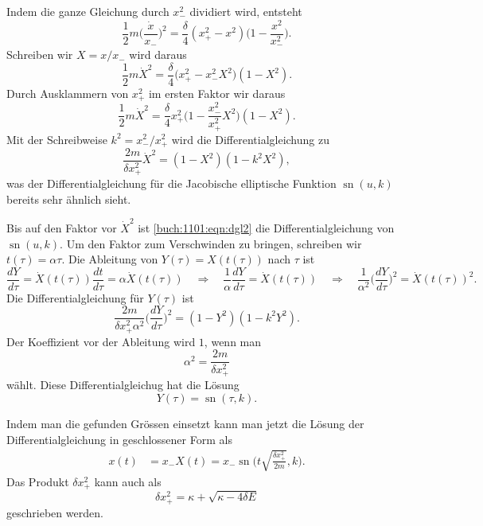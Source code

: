 \begin{loesung}
\begin{teilaufgaben}
\item
Indem die ganze Gleichung durch $x_-^2$ dividiert wird, entsteht 
\[
\frac12m
\biggl(\frac{\dot{x}}{x_-}\biggr)^2
=
\frac{\delta}{4}
(x_+^2-x^2)
\biggl(1-\frac{x^2}{x_-^2}\biggr).
\]
Schreiben wir $X=x/x_-$ wird daraus
\[
\frac1{2}m\dot{X}^2
=
\frac{\delta}{4}
\biggl(x_+^2-x_-^2 X^2\biggr)
(1-X^2).
\]
Durch Ausklammern von $x_+^2$ im ersten Faktor  wir daraus
\[
\frac1{2}m\dot{X}^2
=
\frac{\delta}{4}
x_+^2
\biggl(1-\frac{x_-^2}{x_+^2} X^2\biggr)
(1-X^2).
\]
Mit der Schreibweise $k^2 = x_-^2/x_+^2$ wird die Differentialgleichung
zu
\begin{equation}
\frac{2m}{\delta x_+^2} \dot{X}^2
=
(1-X^2)(1-k^2X^2),
\label{buch:1101:eqn:dgl2}
\end{equation}
was der Differentialgleichung für die Jacobische elliptische Funktion
$\operatorname{sn}(u,k)$ bereits sehr ähnlich sieht.
\item
Bis auf den Faktor vor $\dot{X}^2$ ist 
\eqref{buch:1101:eqn:dgl2}
die Differentialgleichung
von
$\operatorname{sn}(u,k)$.
Um den Faktor zum Verschwinden zu bringen, schreiben wir 
$t(\tau) = \alpha\tau$.
Die Ableitung von $Y(\tau)=X(t(\tau))$ nach $\tau$ ist
\[
\frac{dY}{d\tau}
=
\dot{X}(t(\tau))\frac{dt}{d\tau}
=
\alpha
\dot{X}(t(\tau))
\quad\Rightarrow\quad
\frac{1}{\alpha}\frac{dY}{d\tau}
=
\dot{X}(t(\tau))
\quad\Rightarrow\quad
\frac{1}{\alpha^2}\biggl(\frac{dY}{d\tau}\biggr)^2
=
\dot{X}(t(\tau))^2.
\]
Die Differentialgleichung für $Y(\tau)$ ist
\[
\frac{2m}{\delta x_+^2\alpha^2}
\biggl(
\frac{dY}{d\tau}
\biggr)^2
=
(1-Y^2)(1-k^2Y^2).
\]
Der Koeffizient vor der Ableitung wird $1$, wenn man 
\[
\alpha^2
=
\frac{2m}{\delta x_+^2}
\]
wählt.
Diese Differentialgleichug hat die Lösung
\[
Y(\tau) = \operatorname{sn}(\tau,k).
\]
\item
Indem man die gefunden Grössen einsetzt kann man jetzt die Lösung 
der Differentialgleichung in geschlossener Form als
\begin{align*}
x(t)
&=
x_- X(t)
=
x_- \operatorname{sn}\biggl(
t\sqrt{\frac{\delta x_+^2}{2m} }
,k
\biggr).
\end{align*}
Das Produkt $\delta x_+^2$ kann auch als
\[
\delta x_+^2
=
\kappa+\sqrt{\kappa -4\delta E}
\]
geschrieben werden.
\qedhere
\end{teilaufgaben}
\end{loesung}


